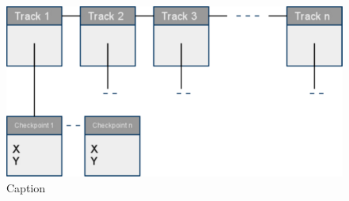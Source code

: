 \begin{figure}[here]

\begin{center}
\includegraphics[scale=0.5]{pics/chapters/chapter4/pathlist2}
\end{center}

\caption{Caption}
\label{fig:dataStructurePath}
\end{figure}

